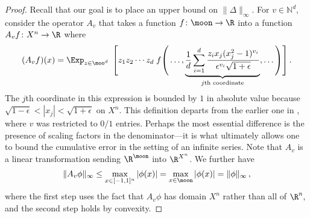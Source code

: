 \begin{proof}
Recall that our goal is to
place an upper bound on $\|\Delta\|_\infty$. 
For $v\in\mathbb N^d,$ 
consider the operator $A_v$ that
takes a function $f\colon\moon\to\R$ into a function
$A_vf\colon X^n\to\R$ where 
\begin{align*}
(A_vf)(x) = 
\Exp_{z\in\moo^d} \;\left[\rule{0mm}{7mm}
z_1z_2\cdots z_d\;f
\right(
\dots,
\underbrace{\frac1d\sum_{i=1}^d
\frac{z_ix_j(x_j^2-1)^{v_i}}{\epsilon^{v_i}
\sqrt{1+\epsilon}}}_{\text{$j$th
coordinate}}
,\dots\left)\rule{0mm}{7mm}
\rule{0mm}{6mm}\right].
\end{align*}
The $j$th coordinate in this expression is bounded by 
$1$ in absolute value because
$\sqrt{1-\epsilon}<|x_j|<\sqrt{1+\epsilon}$ on $X^n$.
This definition departs from the earlier
one in ,
where $v$ was restricted to $0/1$ entries. Perhaps the most
essential difference is the presence of scaling
factors in the denominator---it is what ultimately
allows one to bound the cumulative error in the setting
of an infinite series. Note that $A_v$ is a linear
transformation sending $\R^{\moon}$ into $\R^{X^n}$. 
We further have
\begin{align}
\|A_v\phi\|_\infty \leq
\max_{x\in[-1,1]^n}|\phi(x)| = 
\max_{x\in\moon}|\phi(x)| = \|\phi\|_\infty\,,
\label{eqn:A_v-small-Rn}
\end{align}
where the first step uses the fact that $A_v\phi$ has
domain $X^n$ rather than all of $\R^n,$ and the second step holds by convexity. 


\end{proof}

